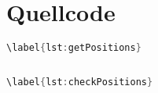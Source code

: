 \documentclass[a4paper,10pt,ngerman]{scrartcl}
\begin{document}
	\section{Quellcode}\label{sec:quellcode}
		\begin{lstlisting}[frame=single, language=Java, title=Methode getPositions, breaklines=true]\label{lst:getPositions}
			
		\end{lstlisting}
		
		\begin{lstlisting}[frame=single, language=Java, title=Methode checkPositions, breaklines=true]\label{lst:checkPositions}
			
		\end{lstlisting}
   
\end{document}
